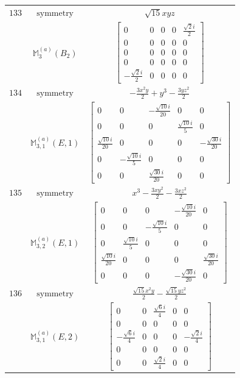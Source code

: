 \documentclass[fleqn,8pt,landscape]{jsarticle}
\begin{document}
\begin{longtable}{ccc}
$ 133 $ & $ \text{symmetry} $ & $ \sqrt{15} x y z $ \\
$  $ & $ \mathbb{M}_{3}^{(a)}(B_{2}) $ & $ \begin{bmatrix} 0 & 0 & 0 & 0 & \frac{\sqrt{2} i}{2} \\ 0 & 0 & 0 & 0 & 0 \\ 0 & 0 & 0 & 0 & 0 \\ 0 & 0 & 0 & 0 & 0 \\ - \frac{\sqrt{2} i}{2} & 0 & 0 & 0 & 0 \end{bmatrix} $ \\ \hline
$ 134 $ & $ \text{symmetry} $ & $ - \frac{3 x^{2} y}{2} + y^{3} - \frac{3 y z^{2}}{2} $ \\
$  $ & $ \mathbb{M}_{3,1}^{(a)}(E,1) $ & $ \begin{bmatrix} 0 & 0 & - \frac{\sqrt{10} i}{20} & 0 & 0 \\ 0 & 0 & 0 & \frac{\sqrt{10} i}{5} & 0 \\ \frac{\sqrt{10} i}{20} & 0 & 0 & 0 & - \frac{\sqrt{30} i}{20} \\ 0 & - \frac{\sqrt{10} i}{5} & 0 & 0 & 0 \\ 0 & 0 & \frac{\sqrt{30} i}{20} & 0 & 0 \end{bmatrix} $ \\ \hline
$ 135 $ & $ \text{symmetry} $ & $ x^{3} - \frac{3 x y^{2}}{2} - \frac{3 x z^{2}}{2} $ \\
$  $ & $ \mathbb{M}_{3,2}^{(a)}(E,1) $ & $ \begin{bmatrix} 0 & 0 & 0 & - \frac{\sqrt{10} i}{20} & 0 \\ 0 & 0 & - \frac{\sqrt{10} i}{5} & 0 & 0 \\ 0 & \frac{\sqrt{10} i}{5} & 0 & 0 & 0 \\ \frac{\sqrt{10} i}{20} & 0 & 0 & 0 & \frac{\sqrt{30} i}{20} \\ 0 & 0 & 0 & - \frac{\sqrt{30} i}{20} & 0 \end{bmatrix} $ \\ \hline
$ 136 $ & $ \text{symmetry} $ & $ \frac{\sqrt{15} x^{2} y}{2} - \frac{\sqrt{15} y z^{2}}{2} $ \\
$  $ & $ \mathbb{M}_{3,1}^{(a)}(E,2) $ & $ \begin{bmatrix} 0 & 0 & \frac{\sqrt{6} i}{4} & 0 & 0 \\ 0 & 0 & 0 & 0 & 0 \\ - \frac{\sqrt{6} i}{4} & 0 & 0 & 0 & - \frac{\sqrt{2} i}{4} \\ 0 & 0 & 0 & 0 & 0 \\ 0 & 0 & \frac{\sqrt{2} i}{4} & 0 & 0 \end{bmatrix} $ \\ \hline

\end{longtable}
\end{document}
